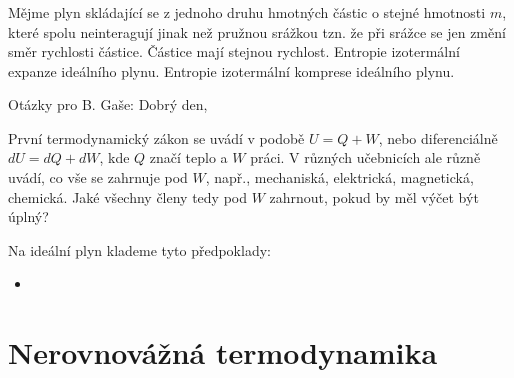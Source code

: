 \subsection{}

Mějme plyn skládající se z jednoho druhu hmotných částic o stejné hmotnosti $m$, které spolu neinteragují jinak než pružnou srážkou tzn. že při srážce se jen změní směr rychlosti částice. Částice mají stejnou rychlost.
Entropie izotermální expanze ideálního plynu.
Entropie izotermální komprese ideálního plynu.


Otázky pro B. Gaše: Dobrý den, 

První termodynamický zákon se uvádí v podobě $ U = Q + W $, nebo diferenciálně $ dU = dQ + dW $, kde $Q$ značí teplo a $W$ práci. V různých učebnicích ale různě uvádí,  co vše se zahrnuje pod $W$, např., 
mechaniská, elektrická, magnetická, chemická. Jaké všechny členy tedy pod $W$ zahrnout, pokud by měl výčet být úplný?

Na ideální plyn klademe tyto předpoklady:

\begin{itemize}
    \item 
\end{itemize}

\chapter{Nerovnovážná termodynamika}

